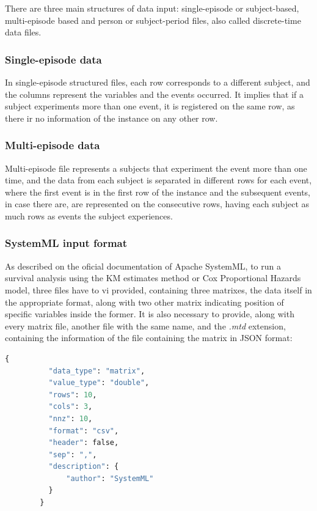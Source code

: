 \documentclass[11pt]{article} %
\begin{document}
      There are three main structures of data input: single-episode or subject-based, multi-episode based and person or subject-period files, also called discrete-time data files.

      \subsubsection*{Single-episode data}

        In single-episode structured files, each row corresponds to a different subject, and the columns represent the variables and the events occurred. It implies that if a subject experiments more than one event, it is registered on the same row, as there ir no information of the instance on any other row.

      \subsubsection*{Multi-episode data}

        Multi-episode file represents a subjects that experiment the event more than one time, and the data from each subject is separated in different rows for each event, where the first event is in the first row of the instance and the subsequent events, in case there are, are represented on the consecutive rows, having each subject as much rows as events the subject experiences.

    \subsubsection{SystemML input format}

      As described on the oficial documentation of Apache SystemML, to run a survival analysis using the KM estimates method or Cox Proportional Hazards model, three files have to vi provided, containing three matrixes, the data itself in the appropriate format, along with two other matrix indicating position of specific variables inside the former. It is also necessary to provide, along with every matrix file, another file with the same name, and the \emph{.mtd} extension, containing the information of the file containing the matrix in JSON format:

      \begin{lstlisting}[label=matrix_metadata_file, language=Python, caption=Example of matrix metadata file in JSON format]
        {
          "data_type": "matrix",
          "value_type": "double",
          "rows": 10,
          "cols": 3,
          "nnz": 10,
          "format": "csv",
          "header": false,
          "sep": ",",
          "description": {
              "author": "SystemML"
          }
        }
      \end{lstlisting}
\end{document}
